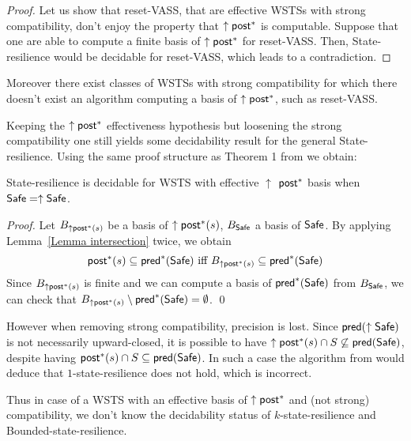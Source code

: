 \begin{proof}
Let us show that reset-VASS, that are effective WSTSs with strong compatibility, don't enjoy the property that $\uparrow \textsf{post}^*$ is computable.
Suppose that one are able to compute a finite basis of $\uparrow \textsf{post}^*$ for reset-VASS. 
Then, {\sc State-resilience} would be decidable for reset-VASS, which leads to a contradiction.
\end{proof} \fi
Moreover there exist classes of WSTSs with strong 
 compatibility for which there doesn't exist an algorithm computing a basis of $\uparrow \textsf{post}^*$, such as reset-VASS.

Keeping the $\uparrow \textsf{post}^*$ effectiveness hypothesis but loosening the strong compatibility one still yields some decidability result for the general {\sc State-resilience}. Using the same proof structure as Theorem 1 from \cite{DBLP:journals/corr/abs-2108-00889} we obtain:


\begin{theorem}\label{post srp}
{\sc State-resilience} is decidable for 
 WSTS with effective 
$\uparrow$ $\textsf{post}^*$ basis
when
$\textsf{Safe}=\uparrow \textsf{Safe}$. 
\end{theorem}


\begin{proof}
Let $B_{\uparrow \textsf{post}^*(s)}$ 
 be a basis of $\uparrow \textsf{post}^*(s)$, $B_{\textsf{Safe}}$ a basis of $\textsf{Safe}$.
By applying Lemma~\ref{Lemma intersection} twice, we obtain
\[ \post^*(s) %
 \subseteq \pred^*(\Safe) \text{ iff } B_{\uparrow \post^*(s)} %
 \subseteq \pred^*(\Safe)\]
Since $B_{\uparrow \textsf{post}^*(s)}$ is finite and we can compute a basis of $\textsf{pred}^*(\textsf{Safe})$ from $B_{\textsf{Safe}}$, we can check that $B_{\uparrow \post^*(s)} %
 \setminus \pred^*(\Safe) = \emptyset$.  \qed
\end{proof}





However when removing strong compatibility, precision is lost.
Since $\textsf{pred}(\uparrow \textsf{Safe})$ is not necessarily upward-closed, it is possible to have 
 $\uparrow \textsf{post}^* (s) \cap S \not\subseteq \textsf{pred}(\textsf{Safe})$,
despite having 
$\textsf{post}^* (s) \cap S \subseteq \textsf{pred}( \textsf{Safe})$.
In such a case the algorithm from
\cite{DBLP:conf/gg/Ozkan22} would deduce that {\sc $1$-state-resilience} does not hold,
which is incorrect.

Thus in case of a WSTS with an effective basis of $\uparrow \textsf{post}^*$ and (not strong) compatibility, we don't know the decidability status of {\sc $k$-state-resilience} and 
{\sc Bounded-state-resilience}. 


